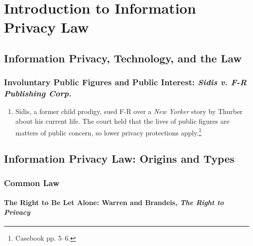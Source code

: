 \section{Introduction to Information Privacy Law}

\subsection{Information Privacy, Technology, and the Law}

\subsubsection{Involuntary Public Figures and Public Interest: \emph{Sidis v. 
F-R Publishing Corp.}}

\begin{enumerate}
    \item Sidis, a former child prodigy, sued F-R over a \emph{New Yorker} 
    story by Thurber about his current life. The court held that the lives of 
    public figures are matters of public concern, so lower privacy protections 
    apply.\footnote{Casebook pp. 5--6.}
\end{enumerate}

\subsection{Information Privacy Law: Origins and Types}

\subsubsection{Common Law}

\paragraph{The Right to Be Let Alone: Warren and Brandeis, \emph{The Right to 
Privacy}}

